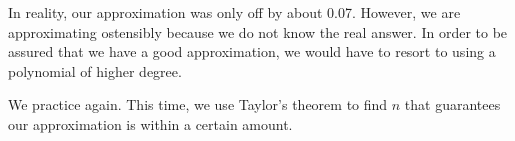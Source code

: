 {\begin{enumerate}
In reality, our approximation was only off by about 0.07. However, we are approximating ostensibly because we do not know the real answer. In order to be assured that we have a good approximation, we would have to resort to using a polynomial of higher degree.
\end{enumerate}
\baselineskip
}\clearpage%

We practice again. This time, we use Taylor's theorem to find $n$ that guarantees our approximation is within a certain amount.\\

